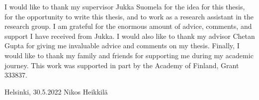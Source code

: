 I would like to thank my supervisor Jukka Suomela for the idea for this thesis, for the opportunity to write this thesis, and to work as a research assistant in the research group.
I am grateful for the enormous amount of advice, comments, and support I have received from Jukka.
I would also like to thank my advisor Chetan Gupta for giving me invaluable advice and comments on my thesis.
Finally, I would like to thank my family and friends for supporting me during my academic journey.
This work was supported in part by the Academy of Finland, Grant 333837.
\vspace{5cm}

Helsinki, 30.5.2022
\vspace{5mm}
{\hfill Nikos Heikkilä \hspace{1cm}}
